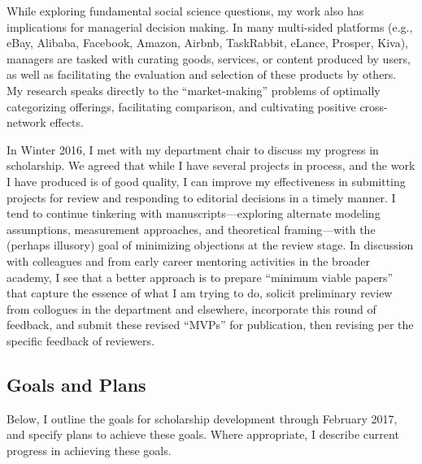 \documentclass[11pt,article,oneside]{memoir}
\begin{document}
While exploring fundamental social science questions, my work also has
implications for managerial decision making. In many multi-sided
platforms (e.g., eBay, Alibaba, Facebook, Amazon, Airbnb, TaskRabbit,
eLance, Prosper, Kiva), managers are tasked with curating goods,
services, or content produced by users, as well as facilitating the
evaluation and selection of these products by others. My research speaks
directly to the \enquote{market-making} problems of optimally
categorizing offerings, facilitating comparison, and cultivating
positive cross-network effects.

In Winter 2016, I met with my department chair to discuss my progress in
scholarship. We agreed that while I have several projects in process,
and the work I have produced is of good quality, I can improve my
effectiveness in submitting projects for review and responding to
editorial decisions in a timely manner. I tend to continue tinkering
with manuscripts---exploring alternate modeling assumptions, measurement
approaches, and theoretical framing---with the (perhaps illusory) goal
of minimizing objections at the review stage. In discussion with
colleagues and from early career mentoring activities in the broader
academy, I see that a better approach is to prepare \enquote{minimum
viable papers} that capture the essence of what I am trying to do,
solicit preliminary review from collogues in the department and
elsewhere, incorporate this round of feedback, and submit these revised
\enquote{MVPs} for publication, then revising per the specific feedback
of reviewers.

\subsection{Goals and Plans}\label{goals-and-plans}

Below, I outline the goals for scholarship development through February
2017, and specify plans to achieve these goals. Where appropriate, I
describe current progress in achieving these goals.
\end{document}
